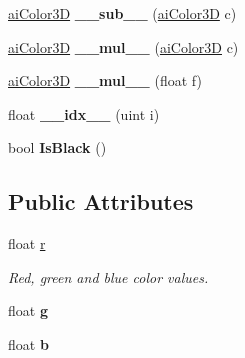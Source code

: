 \begin{DoxyCompactItemize}
\item 
\hypertarget{structai_color3_d_a4b3c90f75b6298a68cedac955f9be485}{\hyperlink{structai_color3_d}{ai\+Color3\+D} {\bfseries \+\_\+\+\_\+sub\+\_\+\+\_\+} (\hyperlink{structai_color3_d}{ai\+Color3\+D} c)}\label{structai_color3_d_a4b3c90f75b6298a68cedac955f9be485}

\item 
\hypertarget{structai_color3_d_a9b6bd10897fbee6a12260da840c87c97}{\hyperlink{structai_color3_d}{ai\+Color3\+D} {\bfseries \+\_\+\+\_\+mul\+\_\+\+\_\+} (\hyperlink{structai_color3_d}{ai\+Color3\+D} c)}\label{structai_color3_d_a9b6bd10897fbee6a12260da840c87c97}

\item 
\hypertarget{structai_color3_d_aae207b09cc4d663d54c6d22fb504f6f6}{\hyperlink{structai_color3_d}{ai\+Color3\+D} {\bfseries \+\_\+\+\_\+mul\+\_\+\+\_\+} (float f)}\label{structai_color3_d_aae207b09cc4d663d54c6d22fb504f6f6}

\item 
\hypertarget{structai_color3_d_a10b2dd337e1319894e9bc6adbc238156}{float {\bfseries \+\_\+\+\_\+idx\+\_\+\+\_\+} (uint i)}\label{structai_color3_d_a10b2dd337e1319894e9bc6adbc238156}

\item 
\hypertarget{structai_color3_d_ac4ade38ef2d5c6d2fba99a3029b2bdca}{bool {\bfseries Is\+Black} ()}\label{structai_color3_d_ac4ade38ef2d5c6d2fba99a3029b2bdca}

\end{DoxyCompactItemize}
\subsection*{Public Attributes}
\begin{DoxyCompactItemize}
\item 
\hypertarget{structai_color3_d_a0ff704458aa26c84bbfe93b2dd89c630}{float \hyperlink{structai_color3_d_a0ff704458aa26c84bbfe93b2dd89c630}{r}}\label{structai_color3_d_a0ff704458aa26c84bbfe93b2dd89c630}

\begin{DoxyCompactList}\small\item\em Red, green and blue color values. \end{DoxyCompactList}\item 
\hypertarget{structai_color3_d_a40ecdcee92b5373cbaa5e00ebcdb2cfb}{float {\bfseries g}}\label{structai_color3_d_a40ecdcee92b5373cbaa5e00ebcdb2cfb}

\item 
\hypertarget{structai_color3_d_a02ddcc7af11f7d4d6ea14f1bfb4ef6c7}{float {\bfseries b}}\label{structai_color3_d_a02ddcc7af11f7d4d6ea14f1bfb4ef6c7}

\end{DoxyCompactItemize}
